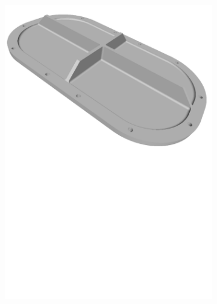 \begin{figure}[h!]
{\begin{tcolorbox}
\begin{subfigure}[c]{.23\textwidth}
          \includegraphics[trim={0cm 12cm 0cm 0cm},clip,width=1\linewidth,angle=0]{Cap5/Figuras/objects/cover_plate.pdf}
          \caption{}
          \label{fig:cover_plate}
      \end{subfigure}
      \hfill
      \begin{subfigure}[c]{.23\textwidth}
          \centering

\end{subfigure}
\end{tcolorbox}}
\end{figure}
